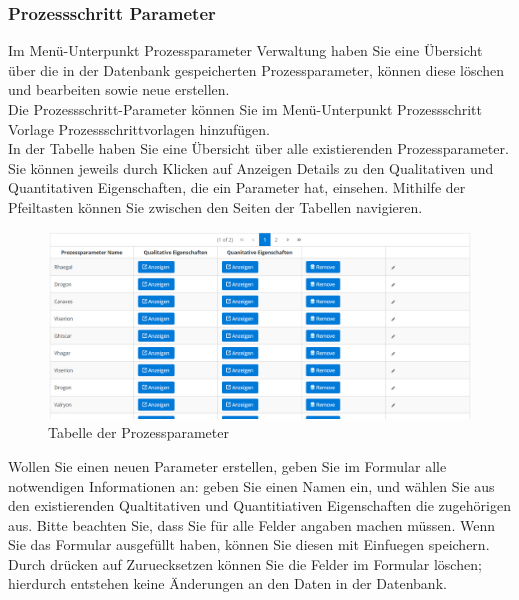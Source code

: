 \documentclass[enabledeprecatedfontcommands,fontsize=12pt,paper=a4,twoside]{scrartcl}
\begin{document}
\subsubsection{Prozessschritt Parameter}

Im Menü-Unterpunkt Prozessparameter Verwaltung haben Sie eine Übersicht über die in der Datenbank gespeicherten Prozessparameter, können diese löschen und bearbeiten sowie neue erstellen. \\

Die Prozessschritt-Parameter können Sie im Menü-Unterpunkt Prozessschritt Vorlage Prozessschrittvorlagen hinzufügen. \\

In der Tabelle haben Sie eine Übersicht über alle existierenden Prozessparameter. Sie können jeweils durch Klicken auf Anzeigen Details zu den Qualitativen und Quantitativen Eigenschaften, die ein Parameter hat, einsehen. Mithilfe der Pfeiltasten können Sie zwischen den Seiten der Tabellen navigieren. \\


\begin{figure}[h!]
\begin{center}
 \includegraphics[width=\textwidth]{screenshots/pk/parametertabelle.png}
  \caption{Tabelle der Prozessparameter}
  \label{fig:boat2}
\end{center}
\end{figure}


Wollen Sie einen neuen Parameter erstellen, geben Sie im Formular alle notwendigen Informationen an: geben Sie einen Namen ein, und wählen Sie aus den existierenden Qualtitativen und Quantitiativen Eigenschaften die zugehörigen aus. Bitte beachten Sie, dass Sie für alle Felder angaben machen müssen. Wenn Sie das Formular ausgefüllt haben, können Sie diesen mit Einfuegen speichern. Durch drücken auf Zuruecksetzen können Sie die Felder im Formular löschen; hierdurch entstehen keine Änderungen an den Daten in der Datenbank. \\
\end{document}
